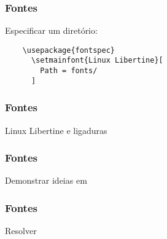 \begin{frame}[fragile]
  \frametitle{Fontes}
  \Large
  Especificar um diretório:

  \begin{verbatim}
    \usepackage{fontspec}
      \setmainfont{Linux Libertine}[
        Path = fonts/
      ]
  \end{verbatim}
\end{frame}

\begin{frame}
  \frametitle{Fontes}
  \LARGE
  Linux Libertine e ligaduras

\end{frame}

\begin{frame}
  \frametitle{Fontes}
  \huge
  Demonstrar ideias em 
\end{frame}

\begin{frame}
  \frametitle{Fontes}
  \huge
  Resolver 
\end{frame}
